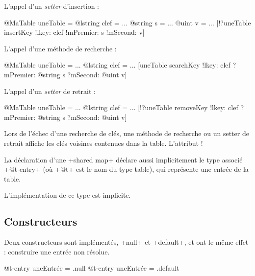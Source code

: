 L'appel d'un \emph{setter} d'insertion :
\begin{galgas}
@MaTable uneTable = {}
@lstring clef = ...
@string s = ...
@uint v = ...
[!?uneTable insertKey !lkey: clef !mPremier: s !mSecond: v]
\end{galgas}



L'appel d'une méthode de recherche :
\begin{galgas}
@MaTable uneTable = {}
...
@lstring clef = ...
[uneTable searchKey !lkey: clef ?mPremier: @string s ?mSecond: @uint v]
\end{galgas}


L'appel d'un \emph{setter} de retrait :
\begin{galgas}
@MaTable uneTable = {}
...
@lstring clef = ...
[!?uneTable removeKey !lkey: clef ?mPremier: @string s ?mSecond: @uint v]
\end{galgas}

Lors de l'échec d'une recherche de clés, une méthode de recherche ou un setter de retrait affiche les clés voisines contenues dans la table. L'attribut \ggs!%




%






La déclaration d'une \ggs+shared map+ déclare aussi implicitement le type associé \ggs+@t-entry+ (où \ggs+@t+ est le nom du type table), qui représente une entrée de la table.

L'implémentation de ce type est implicite. 

\subsection{Constructeurs}

Deux constructeurs sont implémentés, \ggs+null+ et  \ggs+default+, et ont le même effet : construire une entrée non résolue.

\begin{galgas}
  @t-entry uneEntrée = .null
  @t-entry uneEntrée = .default
\end{galgas}


